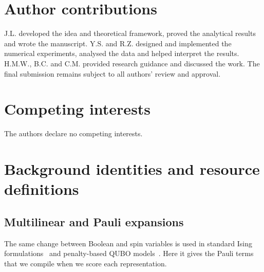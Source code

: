 \documentclass[a4paper,onecolumn,11pt,unpublished]{quantumarticle}
\theoremstyle{remark}
\begin{document}
\section*{Author contributions}
J.L. developed the idea and theoretical framework, proved the analytical
results and wrote the manuscript. Y.S. and R.Z. designed and implemented
the numerical experiments, analysed the data and helped interpret the
results. H.M.W., B.C. and C.M. provided research guidance and discussed
the work. The final submission remains subject to all authors' review
and approval.

\section*{Competing interests}
The authors declare no competing interests.

\appendix
\section{Background identities and resource definitions}
\label{app:background-details}

\subsection{Multilinear and Pauli expansions}
The same change between Boolean and spin variables is used in standard Ising
formulations~\cite{Lucas2014} and penalty-based QUBO
models~\cite{Glover2018}. Here it gives the Pauli terms that we compile when
we score each representation.
\end{document}

